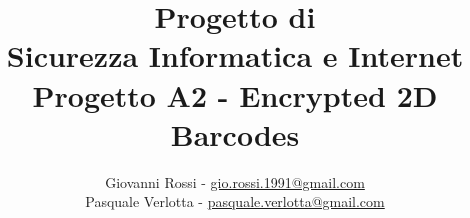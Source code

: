 \documentclass[12pt, a4paper, openany, oneside, titlepage]{book}	%
\begin{document}
	\begin{titlepage}
		
		\title{Progetto di \vspace{2mm} \\ Sicurezza Informatica e Internet \\ \vspace{2 mm} {\large \bf{Progetto A2 - Encrypted 2D Barcodes}}}
		\author{Giovanni Rossi - \url{gio.rossi.1991@gmail.com}\\Pasquale Verlotta - \url{pasquale.verlotta@gmail.com} }
		\date{}%

	\end{titlepage}

	\maketitle

	\frontmatter

	\small




	\tableofcontents 
	\label{Indice}
	
	\listoffigures


	\normalsize

	\mainmatter

	
	
	
	

	\appendix
	
\end{document}
